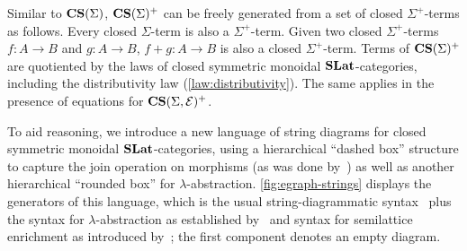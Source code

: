 Similar to $\mathbf{CS}(\Sigma)$, $\mathbf{CS}(\Sigma)^{+}$ can be freely generated from a set of closed $\Sigma^{+}$-terms as follows.
Every closed $\Sigma$-term is also a $\Sigma^{+}$-term.
Given two closed $\Sigma^{+}$-terms $f\colon A \to B$ and $g\colon A \to B$, $f + g\colon A \to B$ is also a closed $\Sigma^{+}$-term.
Terms of $\mathbf{CS}(\Sigma)^{+}$ are quotiented by the laws of closed symmetric monoidal $\mathbf{SLat}$-categories, including the distributivity law (\autoref{law:distributivity}).
The same applies in the presence of equations for $\mathbf{CS}(\Sigma,\mathcal{E})^{+}$.

To aid reasoning, we introduce a new language of string diagrams for closed symmetric monoidal $\mathbf{SLat}$-categories, using a hierarchical \enquote{dashed box} structure to capture the join operation on morphisms (as was done by~\citet{tiurin2025equivalencehypergraphsdporewriting}) as well as another hierarchical \enquote{rounded box} for $\lambda$-abstraction.
\autoref{fig:egraph-strings} displays the generators of this language, which is the usual string-diagrammatic syntax~\cite{Selinger_2010} plus the syntax for $\lambda$-abstraction as established by~\citet{ghica2024stringdiagramslambdacalculifunctional} and syntax for semilattice enrichment as introduced by~\citet{tiurin2025equivalencehypergraphsdporewriting}; the first component denotes an empty diagram.




